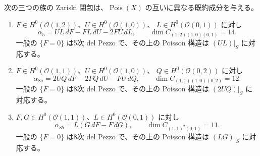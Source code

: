 \begin{theorem}\label{p12:th:threecomponents}
次の三つの族の Zariski 閉包は、$\operatorname{Pois}(X)$ の互いに異なる既約成分を与える。
\begin{enumerate}
\item $F\in H^0(\mathcal O(1,2))$、$U\in H^0(\mathcal O(1,0))$、
$L\in H^0(\mathcal O(0,1))$ に対し
\[
\alpha_{5}=UL\,dF-FL\,dU-2FU\,dL,
\qquad \dim C_{(1,2)(1,0)(0,1)}=14.
\]
一般の $\{F=0\}$ は5次 del Pezzo で、その上の Poisson 構造は $(UL)|_S$ に対応する。
\item $F\in H^0(\mathcal O(1,1))$、$U\in H^0(\mathcal O(1,0))$、
$Q\in H^0(\mathcal O(0,2))$ に対し
\[
\alpha_{8a}=2UQ\,dF-2FQ\,dU-FU\,dQ,
\qquad \dim C_{(1,1)(1,0)(0,2)}=12.
\]
一般の $\{F=0\}$ は8次 del Pezzo で、その上の Poisson 構造は $(2UQ)|_S$ に対応する。
\item $F,G\in H^0(\mathcal O(1,1))$、$L\in H^0(\mathcal O(0,1))$ に対し
\[
\alpha_{8b}=L(G\,dF-F\,dG),
\qquad \dim C_{(1,1)^2(0,1)}=11.
\]
一般の $\{F=0\}$ は8次 del Pezzo で、その上の Poisson 構造は $(LG)|_S$ に対応する。
\end{enumerate}
\end{theorem}
